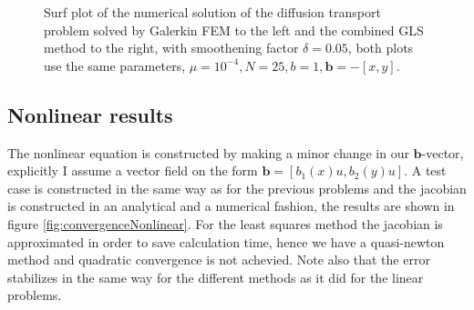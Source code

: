 \begin{figure}[h]
\begin{subfigure}[b]{0.48\textwidth}
  \end{subfigure}
  \vspace{-0.1\baselineskip}
	\caption{Surf plot of the numerical solution of the diffusion transport problem solved by Galerkin FEM to the left and the combined GLS method to the right, with smoothening factor $\delta = 0.05$, both plots use the same parameters, $\mu = 10^{-4},N=25,b = 1,\mathbf{b} = -[x,y]$.}
  \label{fig:SurfDiffTransPositiveFEM}
\end{figure}
%
\subsection{Nonlinear results}
The nonlinear equation is constructed by making a minor change in our $\mathbf{b}$-vector, explicitly I assume a vector field on the form $\mathbf{b}=[b_1(x)u,b_2(y)u]$. A test case is constructed in the same way as for the previous problems and the jacobian is constructed in an analytical and a numerical fashion, the results are shown in figure \ref{fig:convergenceNonlinear}. For the least squares method the jacobian is approximated in order to save calculation time, hence we have a quasi-newton method and quadratic convergence is not achevied. Note also that the error stabilizes in the same way for the different methods as it did for the linear problems. 
%
